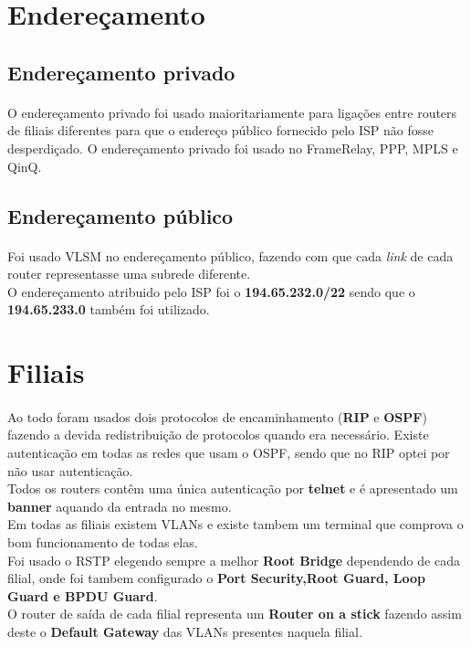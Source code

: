 \documentclass[11pt]{article}
\begin{document}
	\large
	\section{Endereçamento}
	\subsection{Endereçamento privado}
	\normalsize
    \paragraph{}
    O endereçamento privado foi usado maioritariamente para ligações entre routers de filiais diferentes para que o endereço público fornecido pelo ISP não fosse desperdiçado.
    O endereçamento privado foi usado no FrameRelay, PPP, MPLS e QinQ.


    \subsection{Endereçamento público}
    \normalsize
    \paragraph{}
    
    Foi usado VLSM no endereçamento público, fazendo com que cada \emph{link} de cada router representasse uma subrede diferente.\\
    O endereçamento atribuido pelo ISP foi o \textbf{194.65.232.0/22} sendo que o \textbf{194.65.233.0} também foi utilizado.
    
	
    \large
    \section{Filiais}
    \normalsize
    \paragraph{}
    Ao todo foram usados dois protocolos de encaminhamento (\textbf{RIP} e \textbf{OSPF}) fazendo a devida redistribuição de protocolos quando era necessário.
    Existe autenticação em todas as redes que usam o OSPF, sendo que no RIP optei por não usar autenticação.\\
    Todos os routers contêm uma única autenticação por \textbf{telnet} e é apresentado um \textbf{banner} aquando da entrada no mesmo.\\
    Em todas as filiais existem VLANs e existe tambem um terminal que comprova o bom funcionamento de todas elas.\\
    Foi usado o RSTP elegendo sempre a melhor  \textbf{Root Bridge} dependendo de cada filial, onde foi tambem configurado o \textbf{Port Security,Root Guard, Loop Guard e BPDU Guard}.\\
    O router de saída de cada filial representa um \textbf{Router on a stick} fazendo assim deste o \textbf{Default Gateway} das VLANs presentes naquela filial.
\end{document}
